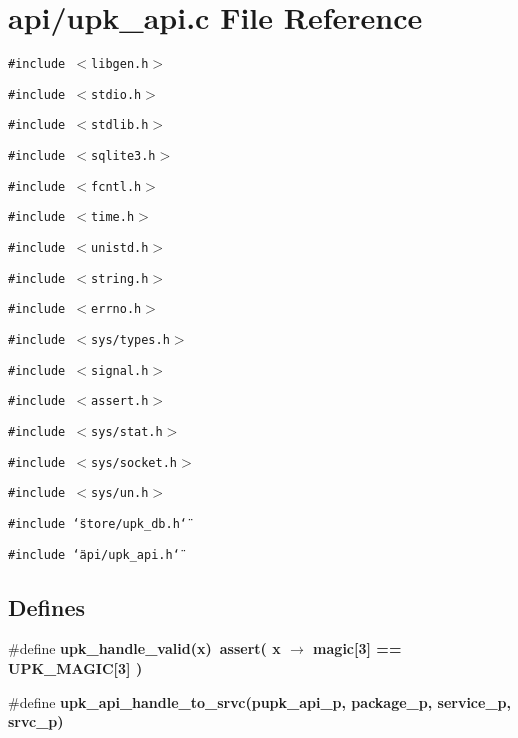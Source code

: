 \section{api/upk\_\-api.c File Reference}
\label{upk__api_8c}
{\tt \#include $<$libgen.h$>$}\par
{\tt \#include $<$stdio.h$>$}\par
{\tt \#include $<$stdlib.h$>$}\par
{\tt \#include $<$sqlite3.h$>$}\par
{\tt \#include $<$fcntl.h$>$}\par
{\tt \#include $<$time.h$>$}\par
{\tt \#include $<$unistd.h$>$}\par
{\tt \#include $<$string.h$>$}\par
{\tt \#include $<$errno.h$>$}\par
{\tt \#include $<$sys/types.h$>$}\par
{\tt \#include $<$signal.h$>$}\par
{\tt \#include $<$assert.h$>$}\par
{\tt \#include $<$sys/stat.h$>$}\par
{\tt \#include $<$sys/socket.h$>$}\par
{\tt \#include $<$sys/un.h$>$}\par
{\tt \#include \char`\"{}store/upk\_\-db.h\char`\"{}}\par
{\tt \#include \char`\"{}api/upk\_\-api.h\char`\"{}}\par
\subsection*{Defines}
\begin{CompactItemize}
\item 
\#define \bf{upk\_\-handle\_\-valid}(x)~assert( x $\rightarrow$ magic[3] == UPK\_\-MAGIC[3] )
\item 
\#define \bf{upk\_\-api\_\-handle\_\-to\_\-srvc}(pupk\_\-api\_\-p, package\_\-p, service\_\-p, srvc\_\-p)
\end{CompactItemize}
